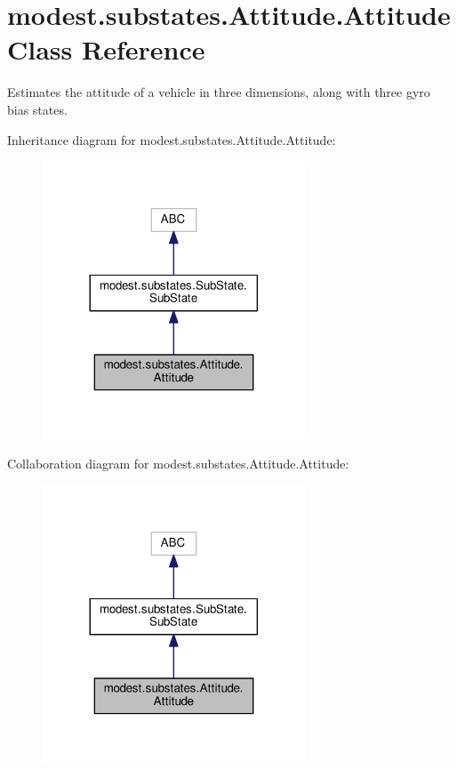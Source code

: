 \hypertarget{classmodest_1_1substates_1_1Attitude_1_1Attitude}{}\section{modest.\+substates.\+Attitude.\+Attitude Class Reference}
\label{classmodest_1_1substates_1_1Attitude_1_1Attitude}


Estimates the attitude of a vehicle in three dimensions, along with three gyro bias states.  




Inheritance diagram for modest.\+substates.\+Attitude.\+Attitude\+:\nopagebreak
\begin{figure}[H]
\begin{center}
\leavevmode
\includegraphics[width=221pt]{classmodest_1_1substates_1_1Attitude_1_1Attitude__inherit__graph}
\end{center}
\end{figure}


Collaboration diagram for modest.\+substates.\+Attitude.\+Attitude\+:\nopagebreak
\begin{figure}[H]
\begin{center}
\leavevmode
\includegraphics[width=221pt]{classmodest_1_1substates_1_1Attitude_1_1Attitude__coll__graph}
\end{center}
\end{figure}
